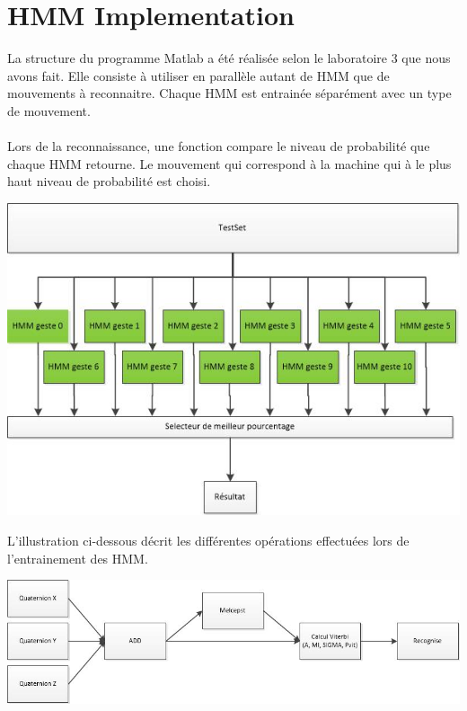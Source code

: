 \section{HMM Implementation}

La structure du programme Matlab a été réalisée selon le laboratoire 3 que nous avons fait. Elle consiste à utiliser en parallèle autant de HMM que de mouvements à reconnaitre. Chaque HMM est entrainée séparément avec un type de mouvement.
\\
\\
Lors de la reconnaissance, une fonction compare le niveau de probabilité que chaque HMM retourne. Le mouvement qui correspond à la machine qui à le plus haut niveau de probabilité est choisi.

\begin{center} 
\hspace{15cm}
\includegraphics[width=15cm]{Ressources/Graphiques/MFB/HMMStructure.jpg}
\end{center}
\vspace{0.5cm} 

L'illustration ci-dessous décrit les différentes opérations effectuées lors de l'entrainement des HMM.

\begin{center} 
\hspace{15cm}
\includegraphics[width=15cm]{Ressources/Graphiques/MFB/TrainingStructure.jpg}
\end{center}
\vspace{0.5cm}



